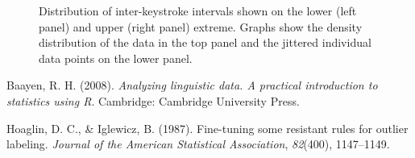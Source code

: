 \documentclass[,man,floatsintext]{apa6}
\begin{document}
\begin{appendix}
\begin{figure}[!h]
{}

\caption{\label{fig:outliers}Distribution of inter-keystroke intervals shown on the lower (left panel) and upper (right panel) extreme. Graphs show the density distribution of the data in the top panel and the jittered individual data points on the lower panel.}\label{fig:fig0a}
\end{figure}

\hypertarget{refs}{}
\leavevmode\hypertarget{ref-baa08book}{}%
Baayen, R. H. (2008). \emph{Analyzing linguistic data. A practical
introduction to statistics using R}. Cambridge: Cambridge University
Press.

\leavevmode\hypertarget{ref-hoaglin1987fine}{}%
Hoaglin, D. C., \& Iglewicz, B. (1987). Fine-tuning some resistant rules
for outlier labeling. \emph{Journal of the American Statistical
Association}, \emph{82}(400), 1147--1149.
\end{appendix}
\end{document}
